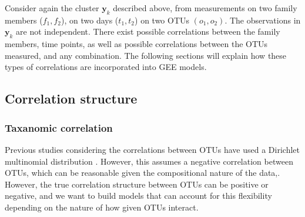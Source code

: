 \documentclass[12pt]{article}
\begin{document}
%
Consider again the cluster $\mathbf{y}_k$ described above, from measurements on two family members ($f_1,f_2$), on two days ($t_1, t_2$) on two OTUs $(o_1,o_2)$. The observations in $\mathbf{y}_k$ are not independent. There exist possible correlations between the family members, time points, as well as possible correlations between the OTUs measured, and any combination. The following sections will explain how these types of correlations are incorporated into GEE models.

\subsection{Correlation structure }
\subsubsection{Taxanomic correlation}
Previous studies considering the correlations between OTUs have used a Dirichlet multinomial distribution \cite{la2012hypothesis}. However, this assumes a negative correlation between OTUs, which can be reasonable given the compositional nature of the data,. However, the true correlation structure between OTUs can be positive or negative\cite{mandal2015analysis}, and we want to build models that can account for this flexibility depending on the nature of how given OTUs interact.
\end{document}
